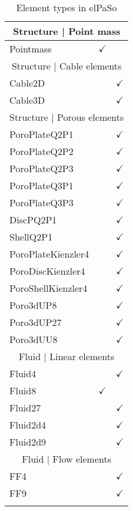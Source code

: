 \begin{longtable}{lcc}
        \multicolumn{3}{c}{Structure | Point mass}             \\ \hline
        Pointmass           & $\checkmark$  &                  \\ \hline
        \multicolumn{3}{c}{Structure | Cable elements}         \\ \hline
        Cable2D             &               & $\checkmark$     \\
        Cable3D             &               & $\checkmark$     \\ \hline
        \multicolumn{3}{c}{Structure | Porous elements}        \\ \hline
        PoroPlateQ2P1       &               & $\checkmark$     \\
        PoroPlateQ2P2       &               & $\checkmark$     \\
        PoroPlateQ2P3       &               & $\checkmark$     \\
        PoroPlateQ3P1       &               & $\checkmark$     \\
        PoroPlateQ3P3       &               & $\checkmark$     \\
        DiscPQ2P1           &               & $\checkmark$     \\
        ShellQ2P1           &               & $\checkmark$     \\
        PoroPlateKienzler4  &               & $\checkmark$     \\
        PoroDiscKienzler4   &               & $\checkmark$     \\
        PoroShellKienzler4  &               & $\checkmark$     \\
        Poro3dUP8           &               & $\checkmark$     \\
        Poro3dUP27          &               & $\checkmark$     \\
        Poro3dUU8           &               & $\checkmark$     \\ \hline
        \multicolumn{3}{c}{Fluid | Linear elements}            \\ \hline
        Fluid4              &               & $\checkmark$     \\ \hline
        Fluid8              & $\checkmark$  &                  \\ \hline
        Fluid27             &               & $\checkmark$     \\
        Fluid2d4            &               & $\checkmark$     \\
        Fluid2d9            &               & $\checkmark$     \\ \hline
        \multicolumn{3}{c}{Fluid | Flow elements}              \\ \hline
        FF4                 &               & $\checkmark$     \\
        FF9                 &               & $\checkmark$     \\ \hline
        \caption{Element types in elPaSo}
\end{longtable}


